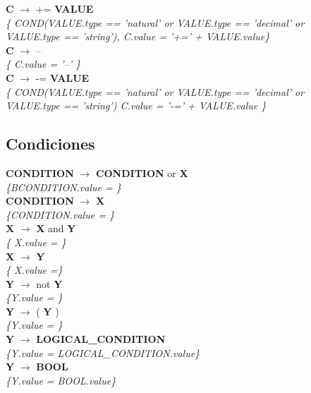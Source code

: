 \documentclass[10pt,a4paper]{article}
\begin{document}
\textbf{C} $\rightarrow$ += \textbf{VALUE} \\
\textit{\{ COND(VALUE.type == 'natural' or VALUE.type ==  'decimal' or VALUE.type ==  'string'), C.value = '+=' + VALUE.value\}} \\

\textbf{C} $\rightarrow$ --  \\
\textit{\{ C.value = '--'  \}} \\

\textbf{C} $\rightarrow$ -= \textbf{VALUE} \\
\textit{\{ COND(VALUE.type == 'natural' or VALUE.type ==  'decimal' or VALUE.type ==  'string') C.value = '-=' + VALUE.value \}} \\


\subsection{Condiciones}

\textbf{CONDITION} $\rightarrow$ \textbf{CONDITION} or \textbf{X} \\
\textit{\{BCONDITION.value = \}} \\

\textbf{CONDITION} $\rightarrow$ \textbf{X} \\
\textit{\{CONDITION.value = \}} \\


\textbf{X} $\rightarrow$  \textbf{X} and \textbf{Y} \\
\textit{\{ X.value = \}} \\

\textbf{X} $\rightarrow$ \textbf{Y} \\
\textit{\{ X.value =\}} \\

\textbf{Y} $\rightarrow$ not \textbf{Y} \\
\textit{\{Y.value = \}} \\

\textbf{Y} $\rightarrow$ ( \textbf{Y} ) \\
\textit{\{Y.value = \}} \\

\textbf{Y} $\rightarrow$ \textbf{LOGICAL\_CONDITION}   \\
\textit{\{Y.value = LOGICAL\_CONDITION.value\}}\\

\textbf{Y} $\rightarrow$ \textbf{BOOL}   \\
\textit{\{Y.value = BOOL.value\}}\\
\end{document}
